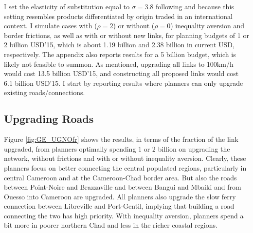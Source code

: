 \documentclass[a4paper]{article}
\begin{document}
I set the elasticity of substitution equal to $\sigma = 3.8$ following \citet{bajzik2020estimating} and \citet{armington1969theory} because this setting resembles products differentiated by origin traded in an international context. I simulate cases with ($\rho = 2$) or without ($\rho = 0$) inequality aversion and border frictions, as well as with or without new links, for planning budgets of 1 or 2 billion USD'15, which is about 1.19 billion and 2.38 billion in current USD, respectively. The appendix also reports results for a 5 billion budget, which is likely not feasible to summon. As mentioned, upgrading all links to 100km/h would cost 13.5 billion USD'15, and constructing all proposed links would cost 6.1 billion USD'15. I start by reporting results where planners can only upgrade existing roads/connections. 

\subsection{Upgrading Roads} 

Figure \ref{fig:GE_UGNOfr} shows the results, in terms of the fraction of the link upgraded, from planners optimally spending 1 or 2 billion on upgrading the network, without frictions and with or without inequality aversion. Clearly, these planners focus on better connecting the central populated regions, particularly in central Cameroon and at the Cameroon-Chad border area. But also the roads between Point-Noire and Brazzaville and between Bangui and Mbaiki and from Ouesso into Cameroon are upgraded. All planners also upgrade the slow ferry connection between Libreville and 
Port-Gentil, implying that building a road connecting the two has high priority. With inequality aversion, planners spend a bit more in poorer northern Chad and less in the richer coastal regions. %

\end{document}
